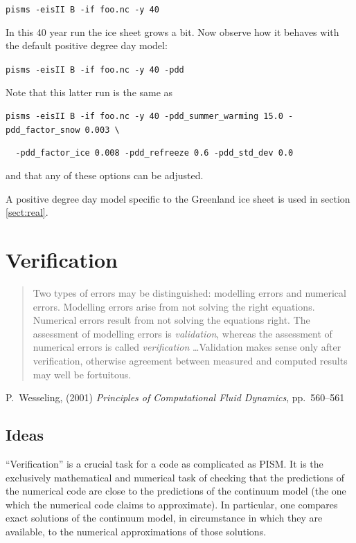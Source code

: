\documentclass[11pt,final]{amsart}
\begin{document}
\verb|pisms -eisII B -if foo.nc -y 40|

\noindent In this 40 year run the ice sheet grows a bit.  Now observe how it behaves with the default positive degree day model:

\verb|pisms -eisII B -if foo.nc -y 40 -pdd|

\noindent Note that this latter run is the same as

\verb|pisms -eisII B -if foo.nc -y 40 -pdd_summer_warming 15.0 -pdd_factor_snow 0.003 \|

\verb|  -pdd_factor_ice 0.008 -pdd_refreeze 0.6 -pdd_std_dev 0.0|

\noindent and that any of these options can be adjusted.

A positive degree day model specific to the Greenland ice sheet is used in section \ref{sect:real}.



\clearpage\newpage
\section{Verification}\label{sect:verif}

\bigskip
\begin{quote}  Two types of errors may be distinguished: modelling errors and numerical errors.  Modelling errors arise from not solving the right equations.  Numerical errors result from not solving the equations right.  The assessment of modelling errors is \emph{validation}, whereas the assessment of numerical errors is called \emph{verification} \dots  Validation makes sense only after verification, otherwise agreement between measured and computed results may well be fortuitous.
\end{quote}
\hfill P.~Wesseling, (2001)  \emph{Principles of Computational Fluid Dynamics}, pp.~560--561 \cite{Wesseling}
\bigskip

\subsection{Ideas} ``Verification'' is a crucial task for a code as complicated as PISM.  It is the exclusively mathematical and numerical task of checking that the predictions of the numerical code are close to the predictions of the continuum model (the one which the numerical code claims to approximate).  In particular, one compares exact solutions of the continuum model, in circumstance in which they are available, to the numerical approximations of those solutions.
\end{document}
